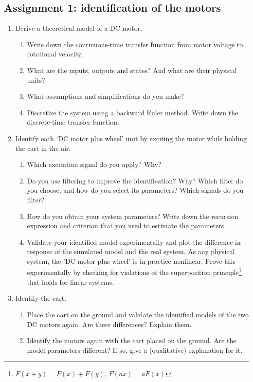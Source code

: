 \documentclass[10pt,a4paper]{article}
\begin{document}
\subsection{Assignment 1: identification of the motors}
\begin{enumerate}
  \item Derive a theoretical model of a DC motor.
  \begin{enumerate}
    \item Write down the continuous-time transfer function from motor voltage to rotational velocity.
    \item What are the inputs, outputs and states? And what are their physical units?
    \item What assumptions and simplifications do you make?
    \item Discretize the system using a backward Euler method. Write down the discrete-time transfer function.
  \end{enumerate}
  \item Identify each `DC motor plus wheel' unit by exciting the motor while holding the cart in the air.
  \begin{enumerate}
    \item Which excitation signal do you apply? Why?
    \item Do you use filtering to improve the identification? Why? Which filter do you choose, and how do you select its parameters? Which signals do you filter?
    \item How do you obtain your system parameters? Write down the recursion expression and criterion that you used to estimate the parameters.
    \item Validate your identified model experimentally and plot the difference in response of the simulated model and the real system. As any physical system, the 'DC motor plus wheel' is in practice nonlinear. Prove this experimentally by checking for violations of the superposition principle\footnote{$F(x+y)=F(x)+F(y),\,F(ax)=aF(x)$} that holds for linear systems.
  \end{enumerate}
  \item Identify the cart.
  \begin{enumerate}
    \item Place the cart on the ground and validate the identified models of the two DC motors again. Are there differences? Explain them.
    \item Identify the motors again with the cart placed on the ground. Are the model parameters different? If so, give a (qualitative) explanation for it.
  \end{enumerate}
\end{enumerate}
\end{document}
